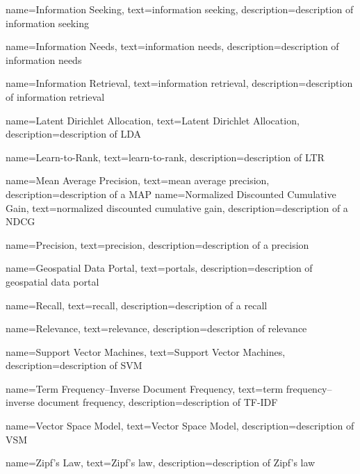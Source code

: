 {
    name=Information Seeking,
    text=information seeking,
    description=description of information seeking
}

{
    name=Information Needs,
    text=information needs,
    description=description of information needs
}

{
    name=Information Retrieval,
    text=information retrieval,
    description=description of information retrieval
}

{
    name=Latent Dirichlet Allocation,
    text=Latent Dirichlet Allocation,
    description=description of LDA
}

{
    name=Learn-to-Rank,
    text=learn-to-rank,
    description=description of LTR
}

{
    name=Mean Average Precision,
    text=mean average precision,
    description=description of a MAP
}
{
    name=Normalized Discounted Cumulative Gain,
    text=normalized discounted cumulative gain,
    description=description of a NDCG
}

{
    name=Precision,
    text=precision,
    description=description of a precision
}

{
    name=Geospatial Data Portal,
    text=portals,
    description=description of geospatial data portal
}

{
    name=Recall,
    text=recall,
    description=description of a recall
}

{
    name=Relevance,
    text=relevance,
    description=description of relevance
}

{
    name=Support Vector Machines,
    text=Support Vector Machines,
    description=description of SVM
}

{
    name=Term Frequency–Inverse Document Frequency,
    text=term frequency–inverse document frequency,
    description=description of TF-IDF
}

{
    name=Vector Space Model,
    text=Vector Space Model,
    description=description of VSM
}

{
    name=Zipf's Law,
    text=Zipf's law,
    description=description of Zipf's law
}